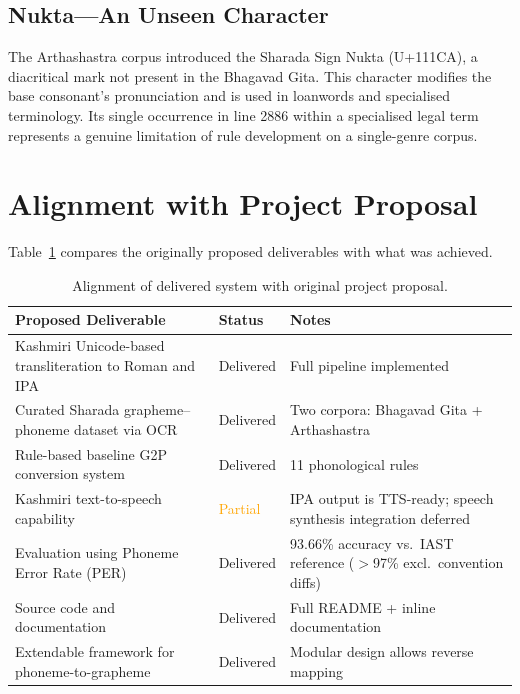 \documentclass[11pt]{article}
\begin{document}
\subsection{Nukta---An Unseen Character}
The Arthashastra corpus introduced the Sharada Sign Nukta (U+111CA), a diacritical mark not present in the Bhagavad Gita. This character modifies the base consonant's pronunciation and is used in loanwords and specialised terminology. Its single occurrence in line 2886 within a specialised legal term represents a genuine limitation of rule development on a single-genre corpus.

\section{Alignment with Project Proposal}

Table~\ref{tab:alignment} compares the originally proposed deliverables with what was achieved.

\begin{table}[t]
\centering
\small
\begin{tabular}{p{6cm}p{4cm}p{4cm}}
\toprule
\textbf{Proposed Deliverable} & \textbf{Status} & \textbf{Notes} \\
\midrule
Kashmiri Unicode-based transliteration to Roman and IPA & \textcolor{green!60!black}{Delivered} & Full pipeline implemented \\
Curated Sharada grapheme--phoneme dataset via OCR & \textcolor{green!60!black}{Delivered} & Two corpora: Bhagavad Gita + Arthashastra \\
Rule-based baseline G2P conversion system & \textcolor{green!60!black}{Delivered} & 11 phonological rules \\
Kashmiri text-to-speech capability & \textcolor{orange}{Partial} & IPA output is TTS-ready; speech synthesis integration deferred \\
Evaluation using Phoneme Error Rate (PER) & \textcolor{green!60!black}{Delivered} & 93.66\% accuracy vs.\ IAST reference ($>$97\% excl.\ convention diffs) \\
Source code and documentation & \textcolor{green!60!black}{Delivered} & Full README + inline documentation \\
Extendable framework for phoneme-to-grapheme & \textcolor{green!60!black}{Delivered} & Modular design allows reverse mapping \\
\bottomrule
\end{tabular}
\caption{Alignment of delivered system with original project proposal.}
\label{tab:alignment}
\end{table}
\end{document}
